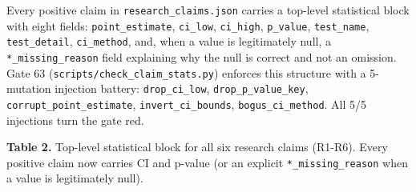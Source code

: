 \documentclass[
]{article}
\begin{document}
Every positive claim in \texttt{research\_claims.json} carries a
top-level statistical block with eight fields: \texttt{point\_estimate},
\texttt{ci\_low}, \texttt{ci\_high}, \texttt{p\_value},
\texttt{test\_name}, \texttt{test\_detail}, \texttt{ci\_method}, and,
when a value is legitimately null, a \texttt{*\_missing\_reason} field
explaining why the null is correct and not an omission. Gate 63
(\texttt{scripts/check\_claim\_stats.py}) enforces this structure with a
5-mutation injection battery: \texttt{drop\_ci\_low},
\texttt{drop\_p\_value\_key}, \texttt{corrupt\_point\_estimate},
\texttt{invert\_ci\_bounds}, \texttt{bogus\_ci\_method}. All 5/5
injections turn the gate red.

\textbf{Table 2.} Top-level statistical block for all six research
claims (R1-R6). Every positive claim now carries CI and p-value (or an
explicit \texttt{*\_missing\_reason} when a value is legitimately null).
\end{document}
